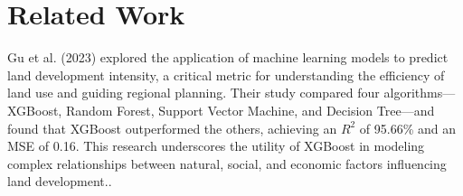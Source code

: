 \section{Related Work}

Gu et al. (2023) explored the application of machine learning models to predict
land development intensity, a critical metric for understanding the efficiency of
land use and guiding regional planning. Their study compared four
algorithms—XGBoost, Random Forest, Support Vector Machine, and Decision Tree—and
found that XGBoost outperformed the others, achieving an $R^{2}$ of 95.66\% and an
MSE of 0.16. This research underscores the utility of XGBoost in modeling
complex relationships between natural, social, and economic factors influencing
land development.\cite{gu2023landdevelopment}.